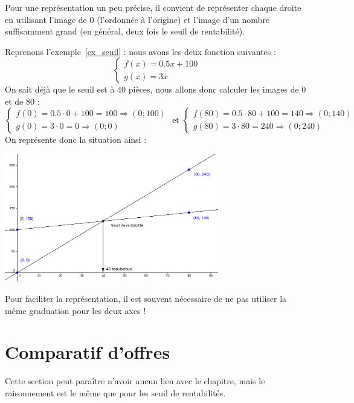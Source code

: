 Pour une représentation un peu précise, il convient de représenter chaque droite en utilisant l'image de $0$ (l'ordonnée à l'origine) et l'image d'un nombre suffisamment grand (en général, deux fois le seuil de rentabilité).

\begin{exemple}
Reprenons l'exemple~\ref{ex_seuil} : nous avons les deux fonction suivantes :
$$
\left\{
\begin{array}{l}
f(x) = 0.5 x + 100\\
g(x) = 3x
\end{array}
\right.
$$
On sait déjà que le seuil est à $40$ pièces, nous allons donc calculer les images de $0$ et de $80$ :
$$
\left\{
\begin{array}{l}
f(0) = 0.5 \cdot 0 + 100 = 100 \Rightarrow (0;100)\\
g(0) = 3\cdot 0 = 0 \Rightarrow (0;0)
\end{array}
\right.
\mbox{ et }
\left\{
\begin{array}{l}
f(80) = 0.5 \cdot 80 + 100 = 140 \Rightarrow (0;140)\\
g(80) = 3\cdot 80 =240 \Rightarrow (0;240)
\end{array}
\right.
$$
On représente donc la situation ainsi :
\begin{center}
\includegraphics[width=0.7\textwidth]{rentabilite/seuil_ex.png}
\end{center}
Pour faciliter la représentation, il est souvent nécessaire de ne pas utiliser la même graduation pour les deux axes !
\end{exemple}

\section{Comparatif d'offres}

Cette section peut paraître n'avoir aucun lien avec le chapitre, mais le raisonnement est le même que pour les seuil de rentabilités.

